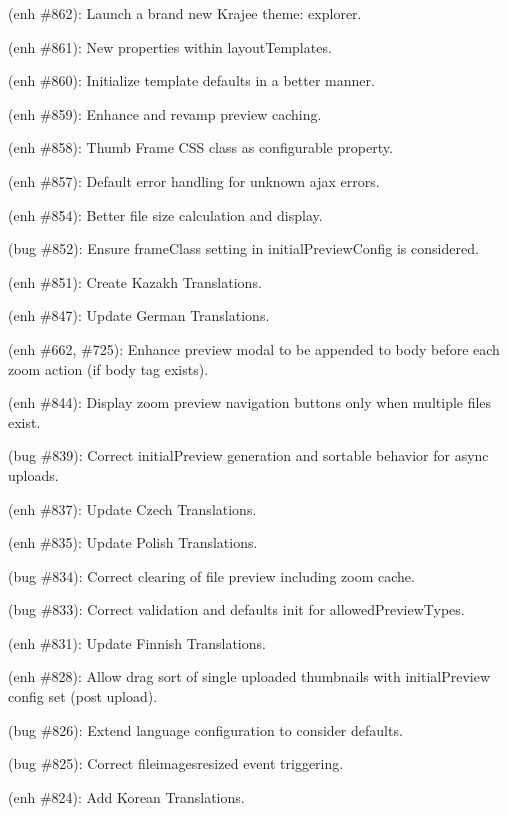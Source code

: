 \begin{DoxyItemize}
\item (enh \#862)\+: Launch a brand new Krajee theme\+: {\ttfamily explorer}.
\item (enh \#861)\+: New properties within {\ttfamily layout\+Templates}.
\item (enh \#860)\+: Initialize template defaults in a better manner.
\item (enh \#859)\+: Enhance and revamp preview caching.
\item (enh \#858)\+: Thumb Frame C\+SS class as configurable property.
\item (enh \#857)\+: Default error handling for unknown ajax errors.
\item (enh \#854)\+: Better file size calculation and display.
\item (bug \#852)\+: Ensure {\ttfamily frame\+Class} setting in {\ttfamily initial\+Preview\+Config} is considered.
\item (enh \#851)\+: Create Kazakh Translations.
\item (enh \#847)\+: Update German Translations.
\item (enh \#662, \#725)\+: Enhance preview modal to be appended to body before each zoom action (if {\ttfamily body} tag exists).
\item (enh \#844)\+: Display zoom preview navigation buttons only when multiple files exist.
\item (bug \#839)\+: Correct {\ttfamily initial\+Preview} generation and sortable behavior for async uploads.
\item (enh \#837)\+: Update Czech Translations.
\item (enh \#835)\+: Update Polish Translations.
\item (bug \#834)\+: Correct clearing of file preview including zoom cache.
\item (bug \#833)\+: Correct validation and defaults init for {\ttfamily allowed\+Preview\+Types}.
\item (enh \#831)\+: Update Finnish Translations.
\item (enh \#828)\+: Allow drag sort of single uploaded thumbnails with {\ttfamily initial\+Preview} config set (post upload).
\item (bug \#826)\+: Extend language configuration to consider defaults.
\item (bug \#825)\+: Correct {\ttfamily fileimagesresized} event triggering.
\item (enh \#824)\+: Add Korean Translations.

\end{DoxyItemize}
